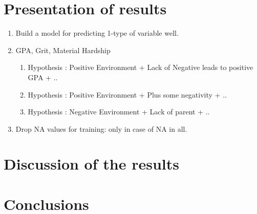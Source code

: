 \documentclass{article} %
\begin{document}
\section{Presentation of results}

\begin{enumerate}
	\item Build a model for predicting 1-type of variable well.
	\item GPA, Grit, Material Hardship
	\begin{enumerate}
		\item Hypothesis : Positive Environment + Lack of Negative leads to positive GPA + ..
		\item Hypothesis : Positive Environment + Plus some negativity + ..
		\item Hypothesis : Negative Environment + Lack of parent + ..
	\end{enumerate}
	\item Drop NA values for training: only in case of NA in all.
\end{enumerate}
\section{Discussion of the results}
\section{Conclusions}





\end{document}
